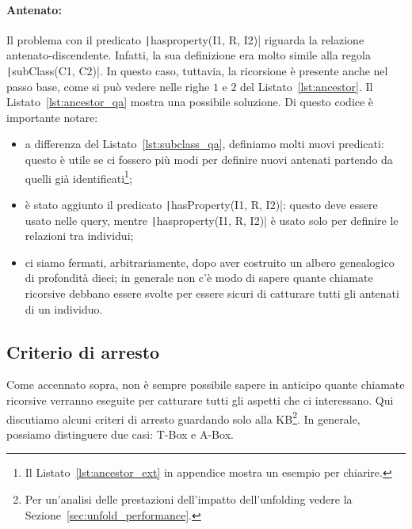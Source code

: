 \begin{listingenv}[h]
	\caption{Unfolding delle sottoclassi}
	\label{lst:subclass_qa}
\end{listingenv}

\paragraph{Antenato:} Il problema con il predicato \texttt|hasproperty(I1, R, I2)| riguarda la relazione antenato-discendente. Infatti, la sua definizione era molto simile alla regola \texttt|subClass(C1, C2)|. In questo caso, tuttavia, la ricorsione è presente anche nel passo base, come si può vedere nelle righe $1$ e $2$ del Listato~\ref{lst:ancestor}. Il Listato~\ref{lst:ancestor_qa} mostra una possibile soluzione. Di questo codice è importante notare:
\begin{itemize}
	\item a differenza del Listato~\ref{lst:subclass_qa}, definiamo molti nuovi predicati: questo è utile se ci fossero più modi per definire nuovi antenati partendo da quelli già identificati\footnote{Il Listato~\ref{lst:ancestor_ext} in appendice mostra un esempio per chiarire.};
	\item è stato aggiunto il predicato \texttt|hasProperty(I1, R, I2)|: questo deve essere usato nelle query, mentre \texttt|hasproperty(I1, R, I2)| è usato solo per definire le relazioni tra individui;
	\item ci siamo fermati, arbitrariamente, dopo aver costruito un albero genealogico di profondità dieci; in generale non c'è modo di sapere quante chiamate ricorsive debbano essere svolte per essere sicuri di catturare tutti gli antenati di un individuo.
\end{itemize}

\begin{listingenv}[h]
	\caption{Unfolding degli antenati}
	\label{lst:ancestor_qa}
\end{listingenv}

\subsection{Criterio di arresto}
Come accennato sopra, non è sempre possibile sapere in anticipo quante chiamate ricorsive verranno eseguite per catturare tutti gli aspetti che ci interessano. Qui discutiamo alcuni criteri di arresto guardando solo alla KB\footnote{Per un'analisi delle prestazioni dell'impatto dell'unfolding vedere la Sezione~\ref{sec:unfold_performance}.}. In generale, possiamo distinguere due casi: T-Box e A-Box.

